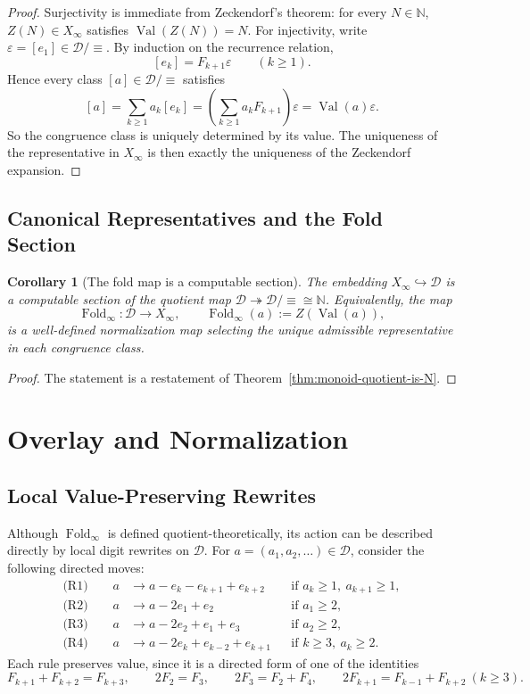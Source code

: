 \documentclass[11pt,letterpaper]{article}
\numberwithin{equation}{section}
\theoremstyle{plain}
\newtheorem{corollary}[theorem]{Corollary}
\theoremstyle{definition}
\theoremstyle{remark}
\newcommand{\D}{\mathcal{D}}
\newcommand{\NN}{\mathbb{N}}
\newcommand{\Xinf}{X_\infty}
\DeclareMathOperator{\Val}{Val}
\DeclareMathOperator{\Fold}{Fold}
\begin{document}
\begin{proof}
Surjectivity is immediate from Zeckendorf's theorem: for every $N\in\NN$,
$Z(N)\in \Xinf$ satisfies $\Val(Z(N))=N$.  For injectivity, write
$\varepsilon=[e_1]\in\D/\!\equiv$.  By induction on the recurrence relation,
\[
[e_k]=F_{k+1}\varepsilon \qquad (k\ge 1).
\]
Hence every class $[a]\in\D/\!\equiv$ satisfies
\[
[a]
=
\sum_{k\ge 1} a_k[e_k]
=
\left(\sum_{k\ge 1} a_kF_{k+1}\right)\varepsilon
=
\Val(a)\varepsilon.
\]
So the congruence class is uniquely determined by its value.  The uniqueness
of the representative in $\Xinf$ is then exactly the uniqueness of the
Zeckendorf expansion.
\end{proof}

\subsection{Canonical Representatives and the Fold Section}

\begin{corollary}[The fold map is a computable section]\label{cor:fold-as-section}
The embedding $\Xinf\hookrightarrow \D$ is a computable section of the quotient
map $\D\twoheadrightarrow \D/\!\equiv \cong \NN$.  Equivalently, the map
\[
\Fold_\infty:\D\to \Xinf,\qquad
\Fold_\infty(a):=Z(\Val(a)),
\]
is a well-defined normalization map selecting the unique admissible
representative in each congruence class.
\end{corollary}

\begin{proof}
The statement is a restatement of Theorem~\ref{thm:monoid-quotient-is-N}.
\end{proof}

\section{Overlay and Normalization}\label{sec:overlay}

\subsection{Local Value-Preserving Rewrites}

Although $\Fold_\infty$ is defined quotient-theoretically, its action can be
described directly by local digit rewrites on $\D$.  For
$a=(a_1,a_2,\ldots)\in\D$, consider the following directed moves:
\begin{align*}
\text{(R1)}\qquad
a&\to a-e_k-e_{k+1}+e_{k+2}
&&\text{if } a_k\ge 1,\ a_{k+1}\ge 1,\\
\text{(R2)}\qquad
a&\to a-2e_1+e_2
&&\text{if } a_1\ge 2,\\
\text{(R3)}\qquad
a&\to a-2e_2+e_1+e_3
&&\text{if } a_2\ge 2,\\
\text{(R4)}\qquad
a&\to a-2e_k+e_{k-2}+e_{k+1}
&&\text{if } k\ge 3,\ a_k\ge 2.
\end{align*}
Each rule preserves value, since it is a directed form of one of the
identities
\[
F_{k+1}+F_{k+2}=F_{k+3},\qquad
2F_2=F_3,\qquad
2F_3=F_2+F_4,\qquad
2F_{k+1}=F_{k-1}+F_{k+2}\ (k\ge 3).
\]
\end{document}
